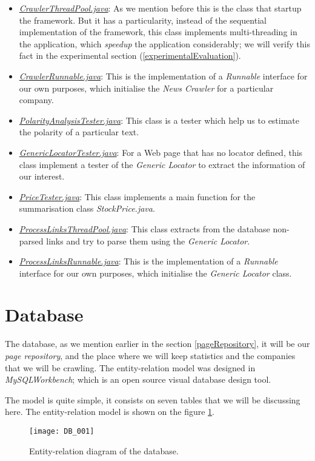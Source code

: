 \begin{itemize}
	\item \emph{\ul{CrawlerThreadPool.java}}: As we mention before this is the class that startup the framework. But it has a particularity, instead of the sequential implementation of the framework, this class implements multi-threading in the application, which \emph{speedup} the application considerably; we will verify this fact in the experimental section (\ref{experimentalEvaluation}).
	\item \emph{\ul{CrawlerRunnable.java}}: This is the implementation of a \emph{Runnable} interface for our own purposes, which initialise the \emph{News Crawler} for a particular company.
	\item \emph{\ul{PolarityAnalysisTester.java}}: This class is a tester which help us to estimate the polarity of a particular text.
	\item \emph{\ul{GenericLocatorTester.java}}: For a Web page that has no locator defined, this class implement a tester of the \emph{Generic Locator} to extract the information of our interest.
	\item \emph{\ul{PriceTester.java}}: This class implements a main function for the summarisation class \emph{StockPrice.java}.
	\item \emph{\ul{ProcessLinksThreadPool.java}}: This class extracts from the database non-parsed links and try to parse them using the \emph{Generic Locator}.
	\item \emph{\ul{ProcessLinksRunnable.java}}: This is the implementation of a \emph{Runnable} interface for our own purposes, which initialise the \emph{Generic Locator} class.
\end{itemize}


\section{Database}

The database, as we mention earlier in the section \ref{pageRepository}, it will be our \emph{page repository}, and the place where we will keep statistics and the companies that we will be crawling. The entity-relation model was designed in \emph{MySQLWorkbench}; which is an open source visual database design tool. 

The model is quite simple, it consists on seven tables that we will be discussing here. The entity-relation model is shown on the figure \ref{fig:DB_001}.

	\begin{figure}\centering
		\texttt{[image: DB\_001]}
		\caption{Entity-relation diagram of the database.}\label{fig:DB_001}
	\end{figure}

